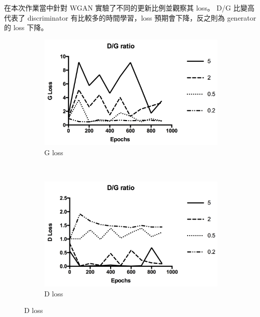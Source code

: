 \documentclass[final,3p]{elsarticle}
\begin{document}
	在本次作業當中針對 WGAN 實驗了不同的更新比例並觀察其 loss。
	D/G 比變高代表了 discriminator 有比較多的時間學習，loss 預期會下降，反之則為 generator 的 loss 下降。
	\begin{figure}[H]
		\centering
		\begin{subfigure}{.48\textwidth}
			\centering
			\includegraphics[width=\linewidth]{images/g_loss_dg}
			\caption{G loss}
		\end{subfigure}
		~
		\begin{subfigure}{.48\textwidth}
			\centering
			\includegraphics[width=\linewidth]{images/d_loss_dg}
			\caption{D loss}
		\end{subfigure}
		\label{fig:dg_loss}
	\end{figure}
	
\end{document}
